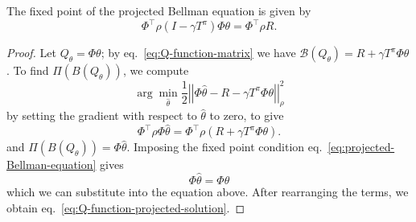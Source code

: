 \begin{theorem}
  The fixed point of the projected Bellman equation is given by
  \begin{equation}
    \label{eq:Q-function-projected-solution}
    \Phi^\top \rho \left(I - \gamma T^\pi\right) \Phi\theta = \Phi^\top\rho R.
  \end{equation}
\end{theorem}
\begin{proof}
  Let $Q_\theta = \Phi \theta$; by eq.~\eqref{eq:Q-function-matrix} we have $\mathcal{B}(Q_\theta) = R + \gamma T^\pi\Phi\theta$. To find $\Pi(B(Q_\theta))$, we compute
  \begin{equation*}
    \arg \min_{\hat{\theta}} \frac{1}{2} \left|\!\left| \Phi \hat{\theta} - R - \gamma T^\pi \Phi\theta \right|\!\right|^2_\rho
  \end{equation*}
  by setting the gradient with respect to $\hat{\theta}$ to zero, to give
  \begin{equation*}
    \Phi^\top\rho\Phi \hat{\theta} = \Phi^\top\rho\left(R + \gamma T^\pi \Phi\theta\right).
  \end{equation*}
  and  $\Pi(B(Q_\theta)) = \Phi\hat{\theta}$. Imposing the fixed point condition eq.~\eqref{eq:projected-Bellman-equation} gives
  \begin{equation*}
    \Phi\hat{\theta} = \Phi\theta
  \end{equation*}
  which we can substitute into the equation above. After rearranging the terms, we obtain eq.~\eqref{eq:Q-function-projected-solution}.
\end{proof}

